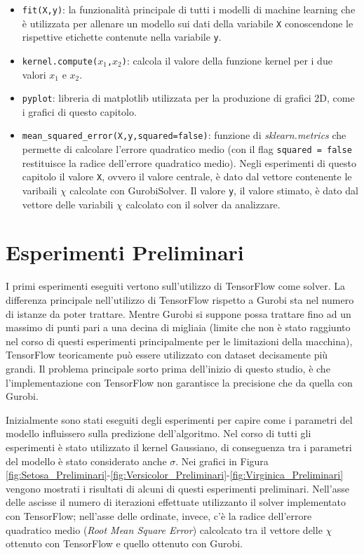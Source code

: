 \documentclass[a4paper,12pt]{report}
\begin{document}
\begin{itemize}
    \item \texttt{fit(X,y)}: la funzionalità principale di tutti i modelli di machine learning che è utilizzata per allenare un modello sui dati della variabile \texttt{X} conoscendone le rispettive etichette contenute nella variabile \texttt{y}.
    \item \texttt{kernel.compute($x_{1}$,$x_{2}$)}: calcola il valore della funzione kernel per i due valori $x_{1}$ e $x_{2}$.
    \item \texttt{pyplot}: libreria di matplotlib utilizzata per la produzione di grafici 2D, come i grafici di questo capitolo.
    \item \texttt{mean\_squared\_error(X,y,squared=false)}: funzione di \textit{sklearn.metrics} che permette di calcolare l'errore quadratico medio (con il flag \texttt{squared = false} restituisce la radice dell'errore quadratico medio). Negli esperimenti di questo capitolo il valore \texttt{X}, ovvero il valore centrale, è dato dal vettore contenente le varibaili $\chi$ calcolate con GurobiSolver. Il valore \texttt{y}, il valore stimato, è dato dal vettore delle variabili $\chi$ calcolato con il solver da analizzare.
\end{itemize}

\section{Esperimenti Preliminari}
I primi esperimenti eseguiti vertono sull'utilizzo di TensorFlow come solver. La differenza principale nell'utilizzo di TensorFlow rispetto a Gurobi sta nel numero di istanze da poter trattare. Mentre Gurobi si suppone possa trattare fino ad un massimo di punti pari a una decina di migliaia (limite che non è stato raggiunto nel corso di questi esperimenti principalmente per le limitazioni della macchina), TensorFlow teoricamente può essere utilizzato con dataset decisamente più grandi. Il problema principale sorto prima dell'inizio di questo studio, è che l'implementazione con TensorFlow non garantisce la precisione che da quella con Gurobi.

Inizialmente sono stati eseguiti degli esperimenti per capire come i parametri del modello influissero sulla predizione dell'algoritmo. Nel corso di tutti gli esperimenti è stato utilizzato il kernel Gaussiano, di conseguenza tra i parametri del modello è stato considerato anche $\sigma$. Nei grafici in Figura \ref{fig:Setosa_Preliminari}-\ref{fig:Versicolor_Preliminari}-\ref{fig:Virginica_Preliminari} vengono mostrati i risultati di alcuni di questi esperimenti preliminari. Nell'asse delle ascisse il numero di iterazioni effettuate utilizzanto il solver implementato con TensorFlow; nell'asse delle ordinate, invece, c'è la radice dell'errore quadratico medio (\textit{Root Mean Square Error}) calcolcato tra il vettore delle $\chi$ ottenuto con TensorFlow e quello ottenuto con Gurobi.
\end{document}
